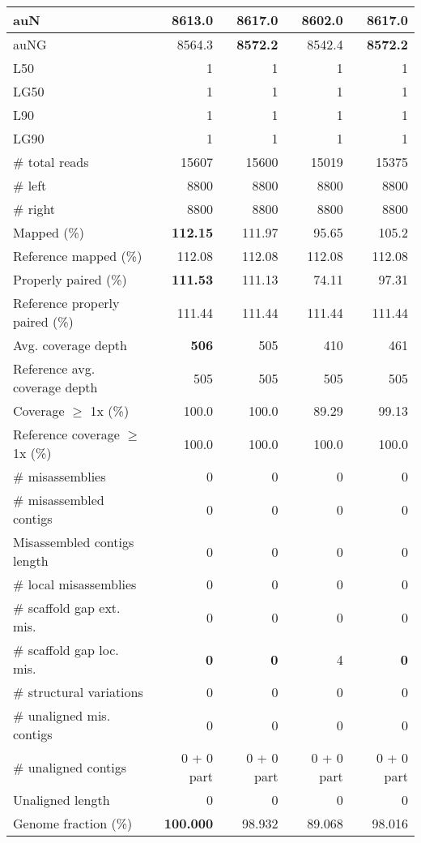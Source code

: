 \documentclass[12pt,a4paper]{article}
\begin{document}
\begin{table}[ht]
\begin{center}
\begin{tabular}{|l*{4}{|r}|}
auN & 8613.0 & {\bf 8617.0} & 8602.0 & {\bf 8617.0} \\ \hline
auNG & 8564.3 & {\bf 8572.2} & 8542.4 & {\bf 8572.2} \\ \hline
L50 & 1 & 1 & 1 & 1 \\ \hline
LG50 & 1 & 1 & 1 & 1 \\ \hline
L90 & 1 & 1 & 1 & 1 \\ \hline
LG90 & 1 & 1 & 1 & 1 \\ \hline
\# total reads & 15607 & 15600 & 15019 & 15375 \\ \hline
\# left & 8800 & 8800 & 8800 & 8800 \\ \hline
\# right & 8800 & 8800 & 8800 & 8800 \\ \hline
Mapped (\%) & {\bf 112.15} & 111.97 & 95.65 & 105.2 \\ \hline
Reference mapped (\%) & 112.08 & 112.08 & 112.08 & 112.08 \\ \hline
Properly paired (\%) & {\bf 111.53} & 111.13 & 74.11 & 97.31 \\ \hline
Reference properly paired (\%) & 111.44 & 111.44 & 111.44 & 111.44 \\ \hline
Avg. coverage depth & {\bf 506} & 505 & 410 & 461 \\ \hline
Reference avg. coverage depth & 505 & 505 & 505 & 505 \\ \hline
Coverage $\geq$ 1x (\%) & 100.0 & 100.0 & 89.29 & 99.13 \\ \hline
Reference coverage $\geq$ 1x (\%) & 100.0 & 100.0 & 100.0 & 100.0 \\ \hline
\# misassemblies & 0 & 0 & 0 & 0 \\ \hline
\# misassembled contigs & 0 & 0 & 0 & 0 \\ \hline
Misassembled contigs length & 0 & 0 & 0 & 0 \\ \hline
\# local misassemblies & 0 & 0 & 0 & 0 \\ \hline
\# scaffold gap ext. mis. & 0 & 0 & 0 & 0 \\ \hline
\# scaffold gap loc. mis. & {\bf 0} & {\bf 0} & 4 & {\bf 0} \\ \hline
\# structural variations & 0 & 0 & 0 & 0 \\ \hline
\# unaligned mis. contigs & 0 & 0 & 0 & 0 \\ \hline
\# unaligned contigs & 0 + 0 part & 0 + 0 part & 0 + 0 part & 0 + 0 part \\ \hline
Unaligned length & 0 & 0 & 0 & 0 \\ \hline
Genome fraction (\%) & {\bf 100.000} & 98.932 & 89.068 & 98.016 \\ \hline

\end{tabular}
\end{center}
\end{table}
\end{document}
